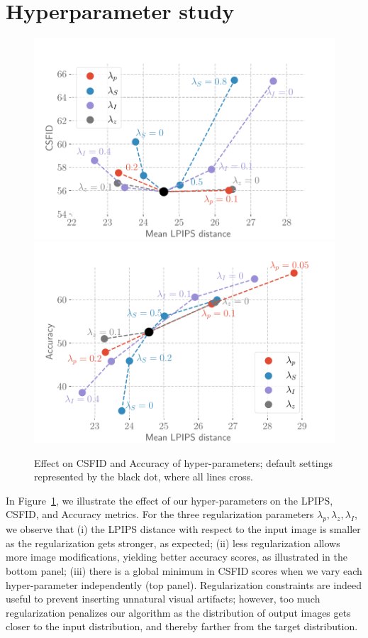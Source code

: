 \section{Hyperparameter study\label{hparam}}

\begin{figure}[h!]
    \centering
    \includegraphics[width=\linewidth]{images/flexit/assets/hparam_fig.pdf}
    \includegraphics[width=\linewidth]{images/flexit/assets/hparam_acc.pdf}
    \caption{Effect  on \ac{CSFID} and Accuracy of hyper-parameters;  default settings  represented by 
    the black dot, where all lines cross.}
\label{fig:hparam_csfid}
\end{figure}


In Figure~\ref{fig:hparam_csfid}, we illustrate the effect of our hyper-parameters on
 the \ac{LPIPS}, \ac{CSFID}, and Accuracy metrics. 
For the three regularization parameters $\lambda_p, \lambda_z, \lambda_I$, we observe
 that
(i) the \ac{LPIPS} distance with respect to the input image is smaller as the regularization 
gets stronger, as expected; 
(ii) less regularization allows more image modifications, yielding better accuracy
 scores, as illustrated in the bottom panel; 
(iii) there is a global minimum in \ac{CSFID} scores when we vary each hyper-parameter 
 independently (top panel). Regularization constraints are indeed useful to prevent
  inserting unnatural visual artifacts; however, too much regularization penalizes our 
  algorithm as the distribution of output images gets closer to the input distribution, 
  and thereby farther from the  target distribution.

